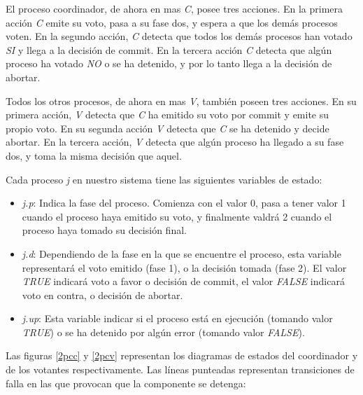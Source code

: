 \documentclass[pdftex,a4paper,12pt]{book}
\begin{document}
El proceso coordinador, de ahora en mas \textit{C}, posee tres acciones. En la primera acci\'on \textit{C} emite su voto, pasa a su fase dos, y espera a que los dem\'as procesos voten. En la segundo acci\'on, \textit{C} detecta que todos los dem\'as procesos han votado \textit{SI} y llega a la decisi\'on de commit. En la tercera acci\'on \textit{C} detecta que alg\'un proceso ha votado \textit{NO} o se ha detenido, y por lo tanto llega a la decisi\'on de abortar.

Todos los otros procesos, de ahora en mas \textit{V}, tambi\'en poseen tres acciones. En su primera acci\'on, \textit{V} detecta que \textit{C} ha emitido su voto por commit y emite su propio voto. En su segunda acci\'on \textit{V} detecta que \textit{C} se ha detenido y decide abortar. En la tercera acci\'on, \textit{V} detecta que alg\'un proceso ha llegado a su fase dos, y toma la misma decisi\'on que aquel.

Cada proceso \textit{j} en nuestro sistema tiene las siguientes variables de estado:
\begin{itemize}
\item \textit{j.p}: Indica la fase del proceso. Comienza con el valor 0, pasa a tener valor 1 cuando el proceso haya emitido su voto, y finalmente valdr\'a 2 cuando el proceso haya tomado su decisi\'on final.
\item \textit{j.d}: Dependiendo de la fase en la que se encuentre el proceso, esta variable representar\'a el voto emitido (fase 1), o la decisi\'on tomada (fase 2). El valor \textit{TRUE} indicar\'a voto a favor o decisi\'on de commit, el valor \textit{FALSE} indicar\'a voto en contra, o decisi\'on de abortar.
\item \textit{j.up}: Esta variable indicar si el proceso est\'a en ejecuci\'on (tomando valor \textit{TRUE}) o se ha detenido por alg\'un error (tomando valor \textit{FALSE}).
\end{itemize}

Las figuras \ref{2pcc} y \ref{2pcv} representan los diagramas de estados del coordinador y de los votantes respectivamente. Las l\'ineas punteadas representan transiciones de falla en las que provocan que la componente se detenga:
\end{document}
